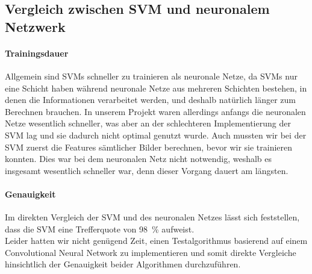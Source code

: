 \subsection{Vergleich zwischen SVM und neuronalem Netzwerk}

\paragraph{Trainingsdauer}

Allgemein sind SVMs schneller zu trainieren als neuronale Netze, da SVMs nur eine Schicht haben während neuronale Netze aus mehreren Schichten bestehen, in denen die Informationen verarbeitet werden, und deshalb natürlich länger zum Berechnen brauchen. In unserem Projekt waren allerdings anfangs die neuronalen Netze wesentlich schneller, was aber an der schlechteren Implementierung der SVM lag und sie dadurch nicht optimal genutzt wurde. Auch mussten wir bei der SVM zuerst die Features sämtlicher Bilder berechnen, bevor wir sie trainieren konnten. Dies war bei dem neuronalen Netz nicht notwendig, weshalb es insgesamt wesentlich schneller war, denn dieser Vorgang dauert am längsten.

\paragraph{Genauigkeit}
Im direkten Vergleich der SVM und des neuronalen Netzes lässt sich feststellen, dass die SVM eine Trefferquote von 98~\% aufweist. \\
Leider hatten wir nicht genügend Zeit, einen Testalgorithmus basierend auf einem Convolutional Neural Network zu implementieren und somit direkte Vergleiche hinsichtlich der Genauigkeit beider Algorithmen durchzuführen.

